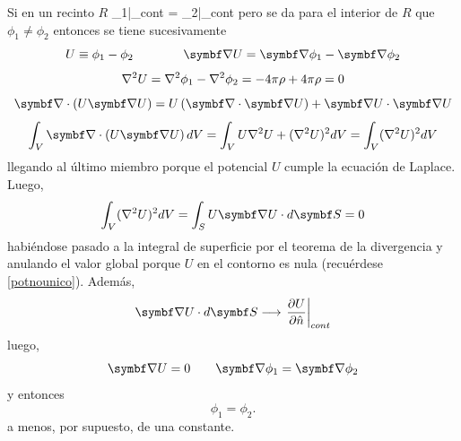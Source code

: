 \documentclass[10pt,oneside]{CBFT_book}
\begin{document}
Si en un recinto $R$
\be
	\phi_1|_{cont} = \phi_2|_{cont}
	\label{potnounico}
\ee
pero se da para el interior de $R$ que $\phi_1\neq\phi_2$ entonces se tiene sucesivamente
\[
	U \equiv \phi_1 - \phi_2 \qquad \qquad \Nabla U = \Nabla \phi_1 - \Nabla \phi_2
\]
\[
	\nabla^2{U} = \nabla^2{\phi_1} - \nabla^2{\phi_2} = -4\pi \rho + 4\pi\rho = 0
\]
\[
	\Nabla\cdot\left( U\Nabla U \right) = U\left( \Nabla\cdot\Nabla U \right) + \Nabla U \cdot \Nabla U
\]
\[
	\int_V \Nabla\cdot\left( U\Nabla U \right) dV = \int_V U \lapm{U}  + (\lapm{U})^2 dV =  \int_V (\lapm{U})^2 dV
\]
llegando al último miembro porque el potencial $U$ cumple la ecuación de Laplace. Luego,
\[
	\int_V (\lapm{U})^2 dV = \int_S U\Nabla{U} \cdot d\vb{S} = 0
\]
habiéndose pasado a la integral de superficie por el teorema de la divergencia y anulando el valor global porque 
$U$ en el contorno es nula (recuérdese \eqref{potnounico}). Además, 
\[
	\Nabla{U} \cdot d\vb{S}  \longrightarrow \left.\dpar{U}{\hat{n}}\right|_{cont}
\]
luego,
\[
	\Nabla U = 0 \qquad \Nabla\phi_1 = \Nabla\phi_2 
\]
y entonces
\[
	\phi_1 = \phi_2 .
\]
a menos, por supuesto, de una constante.



\end{document}
